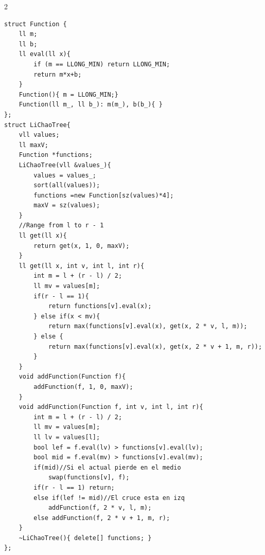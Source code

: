 \documentclass[10pt,spanish,mexico]{article}
\numberwithin{equation}{section}
\begin{document}
\begin{multicols}{2}
\begin{verbatim}
struct Function {
    ll m;
    ll b;
    ll eval(ll x){
        if (m == LLONG_MIN) return LLONG_MIN;
        return m*x+b;
    }
    Function(){ m = LLONG_MIN;}
    Function(ll m_, ll b_): m(m_), b(b_){ }
};
struct LiChaoTree{
    vll values;
    ll maxV;
    Function *functions;
    LiChaoTree(vll &values_){
        values = values_;
        sort(all(values));
        functions =new Function[sz(values)*4];
        maxV = sz(values);
    }
    //Range from l to r - 1
    ll get(ll x){
        return get(x, 1, 0, maxV);
    }
    ll get(ll x, int v, int l, int r){
        int m = l + (r - l) / 2;
        ll mv = values[m];
        if(r - l == 1){
            return functions[v].eval(x);
        } else if(x < mv){
            return max(functions[v].eval(x), get(x, 2 * v, l, m));
        } else {
            return max(functions[v].eval(x), get(x, 2 * v + 1, m, r));
        }
    }
    void addFunction(Function f){
        addFunction(f, 1, 0, maxV);
    }
    void addFunction(Function f, int v, int l, int r){
        int m = l + (r - l) / 2;
        ll mv = values[m];
        ll lv = values[l];
        bool lef = f.eval(lv) > functions[v].eval(lv);
        bool mid = f.eval(mv) > functions[v].eval(mv);
        if(mid)//Si el actual pierde en el medio
            swap(functions[v], f);
        if(r - l == 1) return;
        else if(lef != mid)//El cruce esta en izq
            addFunction(f, 2 * v, l, m);
        else addFunction(f, 2 * v + 1, m, r);
    }
    ~LiChaoTree(){ delete[] functions; }
};
\end{verbatim}
\vspace{-1.2\baselineskip}
\hrulefill

\end{multicols}

\end{document}
